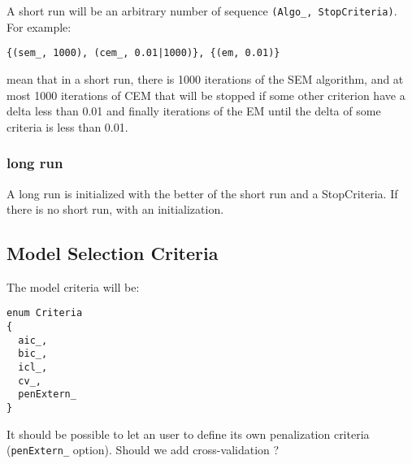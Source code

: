 \documentclass[a4paper,11pt]{article}
\begin{document}
A short run will be an arbitrary number of sequence \verb+(Algo_, StopCriteria)+. For example:
\begin{verbatim}
{(sem_, 1000), (cem_, 0.01|1000)}, {(em, 0.01)}
\end{verbatim}
mean that in a short run, there is 1000 iterations of the SEM algorithm, and at most 1000 iterations
of CEM that will be stopped  if some other criterion have a delta less than 0.01 and finally iterations of the EM
until the delta of some criteria is less than 0.01.

\subsubsection{long run}

A long run is initialized with the better of the short run and a StopCriteria.
If there is no short run, with an initialization.

\subsection{Model Selection Criteria}
The model criteria will be:
\begin{verbatim}
enum Criteria
{
  aic_,
  bic_,
  icl_,
  cv_,
  penExtern_
}
\end{verbatim}
It should be possible to let an user to define its own penalization criteria (\verb+penExtern_+ option).
Should we add cross-validation ?
\end{document}
